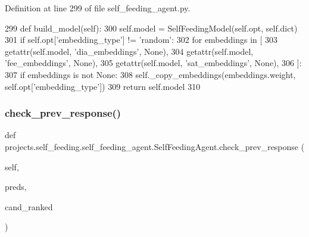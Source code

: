 Definition at line 299 of file self\+\_\+feeding\+\_\+agent.\+py.


\begin{DoxyCode}
299     \textcolor{keyword}{def }build\_model(self):
300         self.model = SelfFeedingModel(self.opt, self.dict)
301         \textcolor{keywordflow}{if} self.opt[\textcolor{stringliteral}{'embedding\_type'}] != \textcolor{stringliteral}{'random'}:
302             \textcolor{keywordflow}{for} embeddings \textcolor{keywordflow}{in} [
303                 getattr(self.model, \textcolor{stringliteral}{'dia\_embeddings'}, \textcolor{keywordtype}{None}),
304                 getattr(self.model, \textcolor{stringliteral}{'fee\_embeddings'}, \textcolor{keywordtype}{None}),
305                 getattr(self.model, \textcolor{stringliteral}{'sat\_embeddings'}, \textcolor{keywordtype}{None}),
306             ]:
307                 \textcolor{keywordflow}{if} embeddings \textcolor{keywordflow}{is} \textcolor{keywordflow}{not} \textcolor{keywordtype}{None}:
308                     self.\_copy\_embeddings(embeddings.weight, self.opt[\textcolor{stringliteral}{'embedding\_type'}])
309         \textcolor{keywordflow}{return} self.model
310 
\end{DoxyCode}
\mbox{\label{classprojects_1_1self__feeding_1_1self__feeding__agent_1_1SelfFeedingAgent_af23daff9436acdeadd63b74396870255}} 
\subsubsection{\texorpdfstring{check\+\_\+prev\+\_\+response()}{check\_prev\_response()}}
{\footnotesize\ttfamily def projects.\+self\+\_\+feeding.\+self\+\_\+feeding\+\_\+agent.\+Self\+Feeding\+Agent.\+check\+\_\+prev\+\_\+response (\begin{DoxyParamCaption}\item[{}]{self,  }\item[{}]{preds,  }\item[{}]{cand\+\_\+ranked }\end{DoxyParamCaption})}



